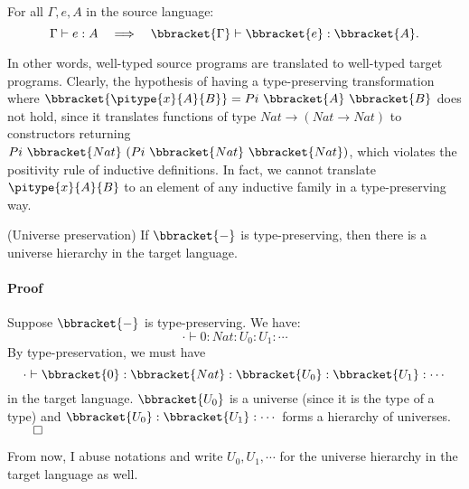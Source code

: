 \begin{definition}
For all $\Gamma, e, A$ in the source language:
\begin{equation*}
	\Gamma \vdash e : A \quad \Longrightarrow \quad \bbracket{\Gamma} \vdash \bbracket{e} : \bbracket{A}.
\end{equation*}
\label{def: type-preservation}
\end{definition}
In other words, well-typed source programs are translated to well-typed target programs. Clearly, the hypothesis of having a type-preserving transformation where $\bbracket{\pitype{x}{A}{B}} = Pi\ \bbracket{A}\ \bbracket{B}$ does not hold, since it translates functions of type $Nat \rightarrow (Nat \rightarrow Nat)$ to constructors returning $Pi\ \bbracket{Nat}\ (Pi\ \bbracket{Nat}\ \bbracket{Nat})$, which violates the positivity rule of inductive definitions. In fact, we cannot translate $\pitype{x}{A}{B}$ to an element of any inductive family in a type-preserving way.

\begin{lemma}(Universe preservation) If $\bbracket{-}$ is type-preserving, then there is a universe hierarchy in the target language. 
\paragraph{Proof} Suppose $\bbracket{-}$ is type-preserving. We have:
\begin{equation*}
	\cdot \vdash 0 : Nat : U_0 : U_1 : \cdots
\end{equation*}
By type-preservation, we must have 
\begin{equation*}
	\cdot \vdash \bbracket{0} : \bbracket{Nat} : \bbracket{U_0} : \bbracket{U_1} : \cdots
\end{equation*}
in the target language. $\bbracket{U_0}$ is a universe (since it is the type of a type) and $\bbracket{U_0} : \bbracket{U_1} : \cdots$ forms a hierarchy of universes. $\qed$
\label{lemma : universe}
\end{lemma}

From now, I abuse notations and write $U_0, U_1, \cdots$ for the universe hierarchy in the target language as well. 

